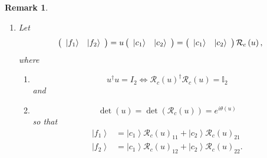 \documentclass[aps,preprint]{revtex4}%
\newtheorem{remark}[theorem]{Remark}
\begin{document}
\begin{remark}
\begin{enumerate}
\begin{enumerate}
\begin{gather}
\begin{array}
v\right)  _{44}%
\end{array}
\right)  \\
=\left(
\begin{array}
[c]{cccc}%
0 & \mathcal{R}_{e}\left(  g\right)  _{12} & 0 & 0\\
-\mathcal{R}_{e}\left(  g\right)  _{12} & 0 & 0 & 0\\
0 & 0 & 0 & \mathcal{R}_{e}\left(  g\right)  _{34}\\
0 & 0 & -\mathcal{R}_{e}\left(  g\right)  _{34} & 0
\end{array}
\right)
\end{gather}

\end{enumerate}

\item Let
\begin{equation}
\left(
\begin{array}
[c]{cc}%
\left\vert f_{1}\right\rangle  & \left\vert f_{2}\right\rangle
\end{array}
\right)  =u\left(
\begin{array}
[c]{cc}%
\left\vert c_{1}\right\rangle  & \left\vert c_{2}\right\rangle
\end{array}
\right)  =\left(
\begin{array}
[c]{cc}%
\left\vert c_{1}\right\rangle  & \left\vert c_{2}\right\rangle
\end{array}
\right)  \mathcal{R}_{c}\left(  u\right)  ,
\end{equation}
where

\begin{enumerate}
\item
\begin{equation}
u^{\dagger}u=I_{2}\Leftrightarrow\mathcal{R}_{c}\left(  u\right)  ^{\dagger
}\mathcal{R}_{c}\left(  u\right)  =\mathbb{I}_{2}%
\end{equation}
and

\item
\begin{equation}
\det\left(  u\right)  =\det\left(  \mathcal{R}_{c}\left(  u\right)  \right)
=e^{i\theta\left(  u\right)  }%
\end{equation}
so that
\begin{align}
\left\vert f_{1}\right\rangle  &  =\left\vert c_{1}\right\rangle
\mathcal{R}_{c}\left(  u\right)  _{11}+\left\vert c_{2}\right\rangle
\mathcal{R}_{c}\left(  u\right)  _{21}\\
\left\vert f_{2}\right\rangle  &  =\left\vert c_{1}\right\rangle
\mathcal{R}_{c}\left(  u\right)  _{12}+\left\vert c_{2}\right\rangle
\mathcal{R}_{c}\left(  u\right)  _{22}.
\end{align}


\end{enumerate}
\end{enumerate}
\end{remark}
\end{document}

